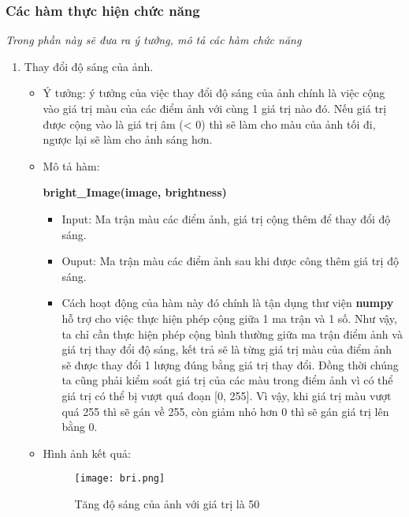 \documentclass{report}
\begin{document}
\subsubsection{Các hàm thực hiện chức năng}
\textit{Trong phần này sẽ đưa ra ý tưởng, mô tả các hàm chức năng}
    \begin{enumerate}
        \item Thay đổi độ sáng của ảnh.
            \begin{itemize}
                \item Ý tưởng: ý tưởng của việc thay đổi độ sáng của ảnh chính là việc cộng vào giá trị màu của các điểm ảnh với cùng 1 giá trị nào đó. Nếu giá trị được cộng vào là giá trị âm (< 0) thì sẽ làm cho màu của ảnh tối đi, ngược lại sẽ làm cho ảnh sáng hơn.
        
                \item Mô tả hàm:
                \begin{center}
            \textbf{bright\_Image(image, brightness)}
                \end{center}
        
                    \begin{itemize}
                        \item Input: Ma trận màu các điểm ảnh, giá trị cộng thêm để thay đổi độ sáng.
                        \item Ouput: Ma trận màu các điểm ảnh sau khi được công thêm giá trị độ sáng.
                        \item Cách hoạt động của hàm này đó chính là tận dụng thư viện \textbf{numpy} hỗ trợ cho việc thực hiện phép cộng giữa 1 ma trận và 1 số. Như vậy, ta chỉ cần thực hiện phép cộng bình thường giữa ma trận điểm ảnh và giá trị thay đổi độ sáng, kết trả sẽ là từng  giá trị màu của điểm ảnh sẽ được thay đổi 1 lượng đúng bằng giá trị thay đổi. Đồng thời chúng ta cũng phải kiểm soát giá trị của các màu trong điểm ảnh vì có thể giá trị có thể bị vượt quá đoạn [0, 255]. Vì vậy, khi giá trị màu vượt quá 255 thì sẽ gán về 255, còn giảm nhỏ hơn 0 thì sẽ gán giá trị lên bằng 0.
                    \end{itemize}
                \pagebreak
                \item Hình ảnh kết quả:
                \begin{figure}[!h]
                    \centering
                    \texttt{[image: bri.png]}
                    \caption{Tăng độ sáng của ảnh với giá trị là 50}
                \end{figure}
            \end{itemize}
            

\end{enumerate}
\end{document}
